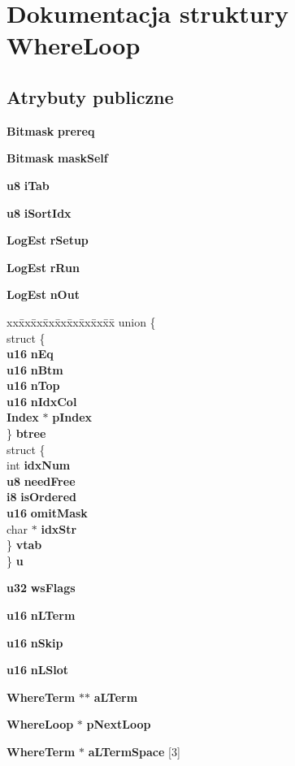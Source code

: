 \section{Dokumentacja struktury Where\+Loop}
\label{struct_where_loop}
\subsection*{Atrybuty publiczne}
\begin{DoxyCompactItemize}
\item 
\textbf{ Bitmask} \textbf{ prereq}
\item 
\textbf{ Bitmask} \textbf{ mask\+Self}
\item 
\textbf{ u8} \textbf{ i\+Tab}
\item 
\textbf{ u8} \textbf{ i\+Sort\+Idx}
\item 
\textbf{ Log\+Est} \textbf{ r\+Setup}
\item 
\textbf{ Log\+Est} \textbf{ r\+Run}
\item 
\textbf{ Log\+Est} \textbf{ n\+Out}
\item 
\begin{tabbing}
xx\=xx\=xx\=xx\=xx\=xx\=xx\=xx\=xx\=\kill
union \{\\
\>struct \{\\
\>\>\textbf{ u16} \textbf{ nEq}\\
\>\>\textbf{ u16} \textbf{ nBtm}\\
\>\>\textbf{ u16} \textbf{ nTop}\\
\>\>\textbf{ u16} \textbf{ nIdxCol}\\
\>\>\textbf{ Index} $\ast$ \textbf{ pIndex}\\
\>\} \textbf{ btree}\\
\>struct \{\\
\>\>int \textbf{ idxNum}\\
\>\>\textbf{ u8} \textbf{ needFree}\\
\>\>\textbf{ i8} \textbf{ isOrdered}\\
\>\>\textbf{ u16} \textbf{ omitMask}\\
\>\>char $\ast$ \textbf{ idxStr}\\
\>\} \textbf{ vtab}\\
\} \textbf{ u}\\

\end{tabbing}\item 
\textbf{ u32} \textbf{ ws\+Flags}
\item 
\textbf{ u16} \textbf{ n\+L\+Term}
\item 
\textbf{ u16} \textbf{ n\+Skip}
\item 
\textbf{ u16} \textbf{ n\+L\+Slot}
\item 
\textbf{ Where\+Term} $\ast$$\ast$ \textbf{ a\+L\+Term}
\item 
\textbf{ Where\+Loop} $\ast$ \textbf{ p\+Next\+Loop}
\item 
\textbf{ Where\+Term} $\ast$ \textbf{ a\+L\+Term\+Space} [3]
\end{DoxyCompactItemize}


